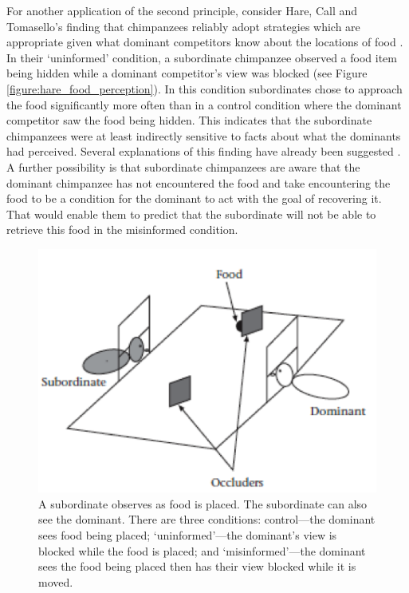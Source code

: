 \documentclass[12pt,\papersize]{extarticle}
\begin{document}
For another application of the second principle, consider Hare, Call and Tomasello’s finding that chimpanzees reliably adopt strategies which are appropriate given what dominant competitors know about the locations of food \citep[]{en_1545}.  In their `uninformed' condition, a subordinate chimpanzee observed a food item being hidden while a dominant competitor’s view was blocked (see Figure \vref{figure:hare_food_perception}).  In this condition subordinates chose to approach the food significantly more often than in a control condition where the dominant competitor saw the food being hidden.  This indicates that the subordinate chimpanzees were at least indirectly sensitive to facts about what the dominants had perceived.  Several explanations of this finding have already been suggested \citep[]{Call:2008di, en_1551, Suddendorf:2003co}.  A further possibility is that subordinate chimpanzees are aware that the dominant chimpanzee has not encountered the food and take encountering the food to be a condition for the dominant to act with the goal of recovering it.  That would enable them to predict that the subordinate will not be able to retrieve this food in the misinformed condition. 



\begin{figure}
\begin{center}
\includegraphics{figure_hare_food_perception.png}
\caption{
	\label{figure:hare_food_perception}
	A subordinate observes as food is placed.  The subordinate can also see the dominant.  There are three conditions: control—the dominant sees food being placed; `uninformed'—the dominant’s view is blocked while the food is placed; and `misinformed'—the dominant sees the food being placed then  has their view blocked while it is moved.
	 \citep[Source:][pp.\ 142, fig. 1]{en_1545}
}
\end{center}
\end{figure}
\end{document}

